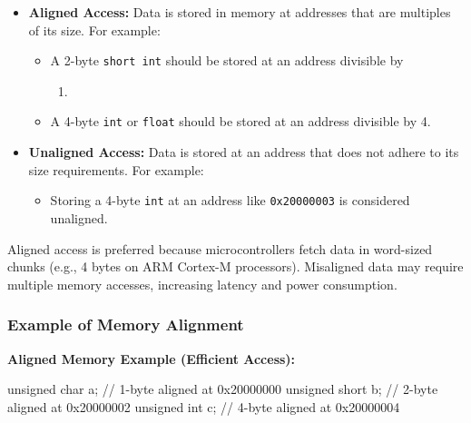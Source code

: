 \documentclass[
  9pt,
  letterpaper,
  abstract,
  titlepage]{scrbook}
\newenvironment{Shaded}{\begin{snugshade}}{\end{snugshade}}
\newcommand{\CommentTok}[1]{\textcolor[rgb]{0.37,0.37,0.37}{#1}}
\newcommand{\DataTypeTok}[1]{\textcolor[rgb]{0.68,0.00,0.00}{#1}}
\newcommand{\NormalTok}[1]{\textcolor[rgb]{0.00,0.23,0.31}{#1}}
\newcommand{\OperatorTok}[1]{\textcolor[rgb]{0.37,0.37,0.37}{#1}}
\providecommand{\tightlist}{%
  \setlength{\itemsep}{0pt}\setlength{\parskip}{0pt}}\usepackage{longtable,booktabs,array}
\def\tightlist{}
\let\tightlist\relax
\begin{document}
\begin{itemize}
\item
  \textbf{Aligned Access:} Data is stored in memory at addresses that
  are multiples of its size. For example:

  \begin{itemize}
  \tightlist
  \item
    A 2-byte \texttt{short\ int} should be stored at an address
    divisible by

    \begin{enumerate}
    \def\labelenumi{\arabic{enumi}.}
    \setcounter{enumi}{1}
    \tightlist
    \item
    \end{enumerate}
  \item
    A 4-byte \texttt{int} or \texttt{float} should be stored at an
    address divisible by 4.
  \end{itemize}
\item
  \textbf{Unaligned Access:} Data is stored at an address that does not
  adhere to its size requirements. For example:

  \begin{itemize}
  \tightlist
  \item
    Storing a 4-byte \texttt{int} at an address like \texttt{0x20000003}
    is considered unaligned.
  \end{itemize}
\end{itemize}

Aligned access is preferred because microcontrollers fetch data in
word-sized chunks (e.g., 4 bytes on ARM Cortex-M processors). Misaligned
data may require multiple memory accesses, increasing latency and power
consumption.

\subsubsection{Example of Memory
Alignment}\label{example-of-memory-alignment}

\textbf{Aligned Memory Example (Efficient Access):}

\begin{Shaded}
\begin{Highlighting}[]
\DataTypeTok{unsigned} \DataTypeTok{char}\NormalTok{ a}\OperatorTok{;}       \CommentTok{// 1{-}byte aligned at 0x20000000}
\DataTypeTok{unsigned} \DataTypeTok{short}\NormalTok{ b}\OperatorTok{;}      \CommentTok{// 2{-}byte aligned at 0x20000002}
\DataTypeTok{unsigned} \DataTypeTok{int}\NormalTok{ c}\OperatorTok{;}        \CommentTok{// 4{-}byte aligned at 0x20000004}
\end{Highlighting}
\end{Shaded}
\end{document}
